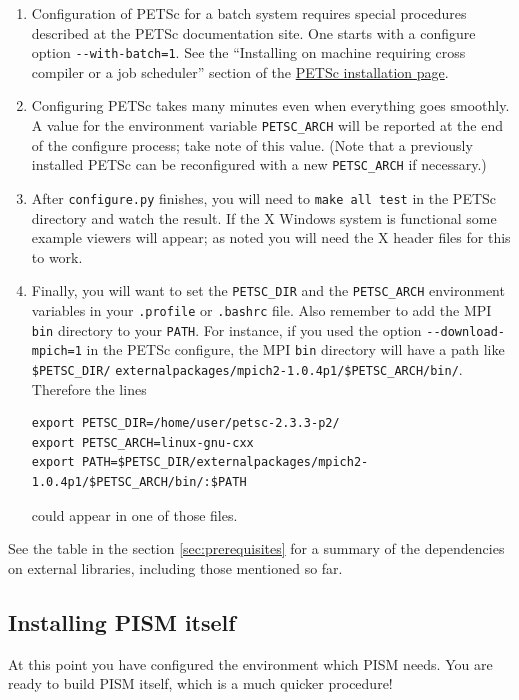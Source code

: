 \documentclass[11pt,final]{amsart}
\begin{document}
\begin{enumerate}
\begin{enumerate}
\item Configuration of PETSc for a batch system requires special procedures described at the PETSc documentation site.  One starts with a configure option \verb|--with-batch=1|.  See the ``Installing on machine requiring cross compiler or a job scheduler'' section of the \href{http://www-unix.mcs.anl.gov/petsc/petsc-2/documentation/installation.html}{PETSc installation page}.

\item  Configuring PETSc takes many minutes even when everything goes smoothly.   A value for the environment variable \verb|PETSC_ARCH| will be reported at the end of the configure process; take note of this value.  (Note that a previously installed PETSc can be reconfigured with a new \verb|PETSC_ARCH| if necessary.)

\item  After \verb|configure.py| finishes, you will need to \verb|make all test| in the PETSc directory and watch the result.  If the X Windows system is functional some example viewers will appear; as noted you will need the X header files for this to work.

\item Finally, you will want to set the \verb|PETSC_DIR| and the \verb|PETSC_ARCH| environment variables in your \verb|.profile| or \verb|.bashrc| file.  Also remember to add the MPI \verb|bin| directory to your \verb|PATH|.  For instance, if you used the option \verb|--download-mpich=1| in the PETSc configure, the MPI \verb|bin| directory will have a path like \verb|$PETSC_DIR/| \verb|externalpackages/mpich2-1.0.4p1/$PETSC_ARCH/bin/|.  Therefore the lines 
\begin{verbatim}
export PETSC_DIR=/home/user/petsc-2.3.3-p2/
export PETSC_ARCH=linux-gnu-cxx
export PATH=$PETSC_DIR/externalpackages/mpich2-1.0.4p1/$PETSC_ARCH/bin/:$PATH
\end{verbatim}
\noindent could appear in one of those files.
\end{enumerate}
\end{enumerate}
\medskip See the table in the section \ref{sec:prerequisites} for a summary of the dependencies on external libraries, including
those mentioned so far.

\subsection{Installing PISM itself}
\label{sec:pism-itself}
At this point you have configured the environment which PISM needs.  You are ready to build PISM itself, which is a much quicker procedure!
\end{document}
